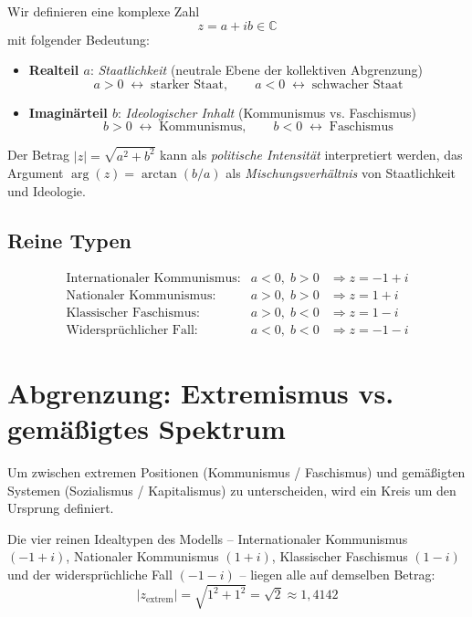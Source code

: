 \documentclass[12pt, a4paper]{article}
\begin{document}
Wir definieren eine komplexe Zahl
\[
z = a + i b \in \mathbb{C}
\]
mit folgender Bedeutung:

\begin{itemize}
    \item \textbf{Realteil \(a\)}: \emph{Staatlichkeit} (neutrale Ebene der kollektiven Abgrenzung)
    \[
    a > 0 \; \leftrightarrow \; \text{starker Staat}, \qquad
    a < 0 \; \leftrightarrow \; \text{schwacher Staat}
    \]
    \item \textbf{Imaginärteil \(b\)}: \emph{Ideologischer Inhalt} (Kommunismus vs. Faschismus)
    \[
    b > 0 \; \leftrightarrow \; \text{Kommunismus}, \qquad
    b < 0 \; \leftrightarrow \; \text{Faschismus}
    \]
\end{itemize}

Der Betrag \(|z| = \sqrt{a^2 + b^2}\) kann als \emph{politische Intensität} interpretiert werden, das Argument \(\arg(z) = \arctan(b/a)\) als \emph{Mischungsverhältnis} von Staatlichkeit und Ideologie.

\subsection*{Reine Typen}
\[
\begin{array}{lll}
\text{Internationaler Kommunismus:} & a < 0,\; b > 0 & \Rightarrow z = -1 + i \\[4pt]
\text{Nationaler Kommunismus:} & a > 0,\; b > 0 & \Rightarrow z = 1 + i \\[4pt]
\text{Klassischer Faschismus:} & a > 0,\; b < 0 & \Rightarrow z = 1 - i \\[4pt]
\text{Widersprüchlicher Fall:} & a < 0,\; b < 0 & \Rightarrow z = -1 - i
\end{array}
\]

\section*{Abgrenzung: Extremismus vs. gemäßigtes Spektrum}

Um zwischen extremen Positionen (Kommunismus / Faschismus) und gemäßigten Systemen (Sozialismus / Kapitalismus) zu unterscheiden, wird ein Kreis um den Ursprung definiert.

Die vier reinen Idealtypen des Modells – Internationaler Kommunismus \((-1 + i)\), Nationaler Kommunismus \((1 + i)\), Klassischer Faschismus \((1 - i)\) und der widersprüchliche Fall \((-1 - i)\) – liegen alle auf demselben Betrag:
\[
|z_{\text{extrem}}| = \sqrt{1^2 + 1^2} = \sqrt{2} \approx 1{,}4142
\]
\end{document}

